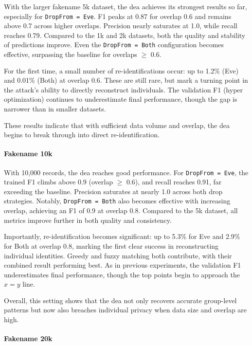 With the larger fakename 5k dataset, the \ac{dea} achieves its strongest results so far, especially for \texttt{DropFrom = Eve}.
F1 peaks at 0.87 for overlap 0.6 and remains above 0.7 across higher overlaps.
Precision nearly saturates at 1.0, while recall reaches 0.79.
Compared to the 1k and 2k datasets, both the quality and stability of predictions improve.
Even the \texttt{DropFrom = Both} configuration becomes effective, surpassing the baseline for overlaps $\geq$ 0.6.

For the first time, a small number of re-identifications occur: up to 1.2\% (Eve) and 0.01\% (Both) at overlap 0.6.
These are still rare, but mark a turning point in the attack’s ability to directly reconstruct individuals.
The validation F1 (hyper optimization) continues to underestimate final performance, though the gap is narrower than in smaller datasets.

These results indicate that with sufficient data volume and overlap, the \ac{dea} begins to break through into direct re-identification.

\paragraph{Fakename 10k}

With 10{,}000 records, the \ac{dea} reaches good performance.
For \texttt{DropFrom = Eve}, the trained F1 climbs above 0.9 (overlap $\geq$ 0.6), and recall reaches 0.91, far exceeding the baseline.
Precision saturates at nearly 1.0 across both drop strategies.
Notably, \texttt{DropFrom = Both} also becomes effective with increasing overlap, achieving an F1 of 0.9 at overlap 0.8.
Compared to the 5k dataset, all metrics improve further in both quality and consistency.

Importantly, re-identification becomes significant: up to 5.3\% for Eve and 2.9\% for Both at overlap 0.8, marking the first clear success in reconstructing individual identities.
Greedy and fuzzy matching both contribute, with their combined result performing best.
As in previous experiments, the validation F1 underestimates final performance, though the top points begin to approach the $x = y$ line.

Overall, this setting shows that the \ac{dea} not only recovers accurate group-level patterns but now also breaches individual privacy when data size and overlap are high.

\paragraph{Fakename 20k}

